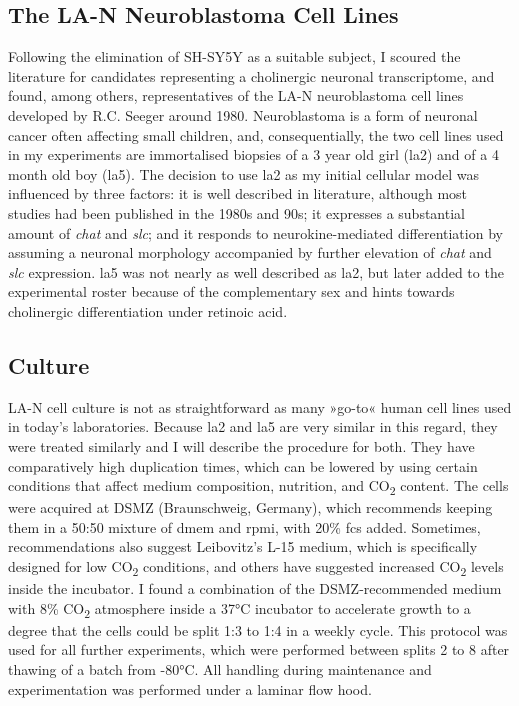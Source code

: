 \subsection{The LA-N Neuroblastoma Cell Lines}
Following the elimination of SH-SY5Y as a suitable subject, I scoured the literature for candidates representing a cholinergic neuronal transcriptome, and found, among others, representatives of the LA-N neuroblastoma cell lines developed by R.C. Seeger around 1980\cite{Seeger1977, Seeger1982}. Neuroblastoma is a form of neuronal cancer often affecting small children, and, consequentially, the two cell lines used in my experiments are immortalised biopsies of a 3 year old girl (\acs{la2}\cite{Seeger1977}) and of a 4 month old boy (\mbox{\acs{la5}}\cite{Seeger1982}). The decision to use \ac{la2} as my initial cellular model was influenced by three factors: it is well described in literature, although most studies had been published in the 1980s and 90s; it expresses a substantial amount of \textit{\ac{chat}} and \textit{\ac{slc}}; and it responds to neurokine-mediated differentiation by assuming a neuronal morphology accompanied by further elevation of \textit{\ac{chat}} and \textit{\ac{slc}} expression. \ac{la5} was not nearly as well described as \ac{la2}, but later added to the experimental roster because of the complementary sex and hints towards cholinergic differentiation under retinoic acid\cite{Hill1997}.

\subsection{Culture}
LA-N cell culture is not as straightforward as many »go-to« human cell lines used in today's laboratories. Because \ac{la2} and \ac{la5} are very similar in this regard, they were treated similarly and I will describe the procedure for both. They have comparatively high duplication times, which can be lowered by using certain conditions that affect medium composition, nutrition, and CO\textsubscript{2} content. The cells were acquired at DSMZ (Braunschweig, Germany), which recommends keeping them in a 50:50 mixture of \ac{dmem} and \ac{rpmi}, with 20\% \ac{fcs} added. Sometimes, recommendations also suggest Leibovitz's L-15 medium, which is specifically designed for low CO\textsubscript{2} conditions, and others have suggested increased CO\textsubscript{2} levels inside the incubator. I found a combination of the DSMZ-recommended medium with 8\% CO\textsubscript{2} atmosphere inside a 37°C incubator to accelerate growth to a degree that the cells could be split 1:3 to 1:4 in a weekly cycle. This protocol was used for all further experiments, which were performed between splits 2 to 8 after thawing of a batch from -80°C. All handling during maintenance and experimentation was performed under a laminar flow hood.

